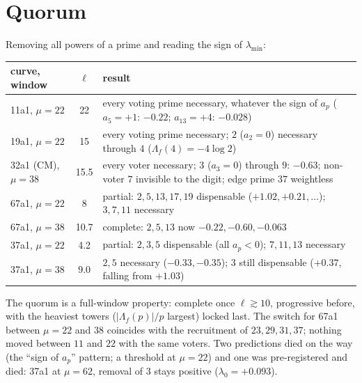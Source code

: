 \documentclass[11pt]{article}
\begin{document}
\section{Quorum}
Removing all powers of a prime and reading the sign of $\lambda_{\min}$:
\begin{center}\small
\begin{tabular}{lcl}\toprule
curve, window & $\ell$ & result\\\midrule
11a1, $\mu=22$ & 22 & every voting prime necessary, whatever the sign of $a_p$ ($a_5=+1$: $-0.22$; $a_{13}=+4$: $-0.028$)\\
19a1, $\mu=22$ & 15 & every voting prime necessary; $2$ ($a_2=0$) necessary through $4$ ($\Lambda_f(4)=-4\log2$)\\
32a1 (CM), $\mu=38$ & 15.5 & every voter necessary; $3$ ($a_3=0$) through $9$: $-0.63$; non-voter $7$ invisible to the digit; edge prime $37$ weightless\\
67a1, $\mu=22$ & 8 & partial: $2,5,13,17,19$ dispensable ($+1.02,+0.21,\dots$); $3,7,11$ necessary\\
67a1, $\mu=38$ & 10.7 & complete: $2,5,13$ now $-0.22,-0.60,-0.063$\\
37a1, $\mu=22$ & 4.2 & partial: $2,3,5$ dispensable (all $a_p<0$); $7,11,13$ necessary\\
37a1, $\mu=38$ & 9.0 & $2,5$ necessary ($-0.33,-0.35$); $3$ still dispensable ($+0.37$, falling from $+1.03$)\\\bottomrule
\end{tabular}
\end{center}
The quorum is a full-window property: complete once $\ell\gtrsim10$, progressive before, with the heaviest towers ($|\Lambda_f(p)|/p$ largest) locked last. The switch for 67a1 between $\mu=22$ and $38$ coincides with the recruitment of $23,29,31,37$; nothing moved between $11$ and $22$ with the same voters. Two predictions died on the way (the ``sign of $a_p$'' pattern; a threshold at $\mu=22$) and one was pre-registered and died: 37a1 at $\mu=62$, removal of $3$ stays positive ($\lambda_0=+0.093$).
\end{document}
